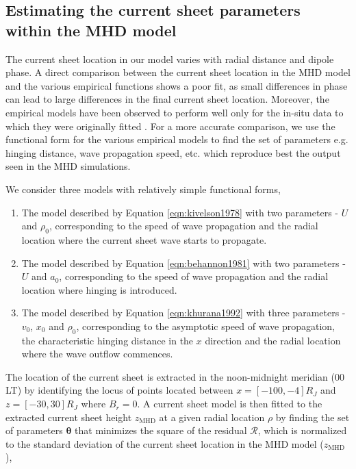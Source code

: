 \subsection{Estimating the current sheet parameters within the MHD model}
The current sheet location in our model varies with radial distance and dipole phase. A direct comparison between the current sheet location in the MHD model and the various empirical functions shows a poor fit, as small differences in phase can lead to large differences in the final current sheet location. Moreover, the empirical models have been observed to perform well only for the in-situ data to which they were originally fitted \cite{Khurana1992a, Behannon1981}. For a more accurate comparison, we use the functional form for the various empirical models to find the set of parameters e.g. hinging distance, wave propagation speed, etc. which reproduce best the output seen in the MHD simulations.

We consider three models with relatively simple functional forms,
\begin{enumerate}
    \item The  model described by Equation \ref{eqn:kivelson1978} with two parameters - $U$ and $\rho_0$, corresponding to the speed of wave propagation and the radial location where the current sheet wave starts to propagate. 
    \item The  model described by Equation \ref{eqn:behannon1981} with two parameters - $U$ and $a_0$, corresponding to the speed of wave propagation and the radial location where hinging is introduced.
    \item The  model described by Equation \ref{eqn:khurana1992} with three parameters - $v_0$, $x_0$ and $\rho_0$, corresponding to the asymptotic speed of wave propagation, the characteristic hinging distance in the $x$ direction and the radial location where the wave outflow commences. 
\end{enumerate}

The location of the current sheet is extracted in the noon-midnight meridian (00 LT) by identifying the locus of points located between $x=[-100, -4] R_J$ and $z=[-30, 30] R_J$ where  $B_r=0$. A current sheet model is then fitted to the extracted current sheet height $z_\text{MHD}$ at a given radial location $\rho$ by finding the set of parameters $\boldsymbol\theta$ that minimizes the square of the residual $\mathcal{R}$, which is normalized to the standard deviation of the current sheet location in the MHD model ($z_\text{MHD}$),

